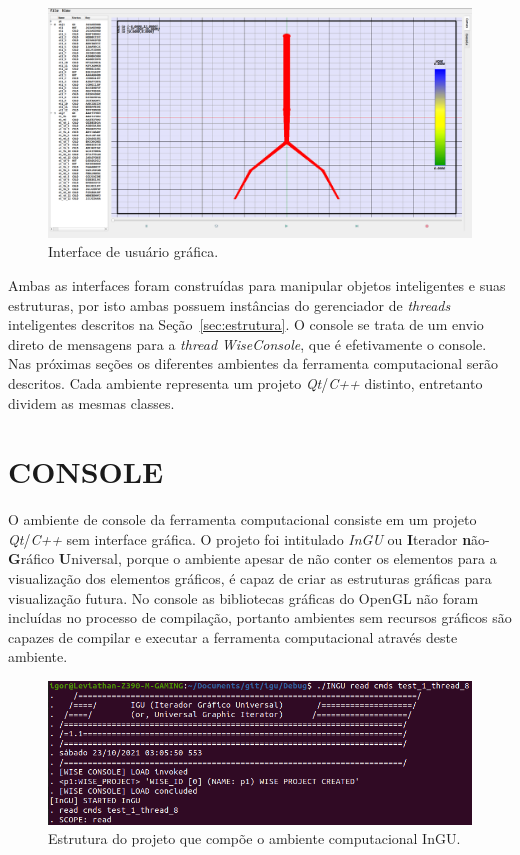 \begin{figure}[!htbp]
	\centering
	\includegraphics[width=\linewidth]{Figures/IGU_002.png}
	\caption{Interface de usuário gráfica.}
	\label{fig10:UI}
\end{figure}

Ambas as interfaces foram construídas para manipular objetos inteligentes e suas estruturas, por isto ambas possuem instâncias do gerenciador de \textit{threads} inteligentes descritos na Seção~\ref{sec:estrutura}. O console se trata de um envio direto de mensagens para a \textit{thread} \textit{WiseConsole}, que é efetivamente o console. Nas próximas seções os diferentes ambientes da ferramenta computacional serão descritos. Cada ambiente representa um projeto \textit{Qt}/\textit{C++} distinto, entretanto dividem as mesmas classes.

\section{CONSOLE}\label{sec:console}

O ambiente de console da ferramenta computacional consiste em um projeto \textit{Qt}/\textit{C++} sem interface gráfica. O projeto foi intitulado \textit{InGU} ou \textbf{I}terador \textbf{n}ão-\textbf{G}ráfico \textbf{U}niversal, porque o ambiente apesar de não conter os elementos para a visualização dos elementos gráficos, é capaz de criar as estruturas gráficas para visualização futura.  No console as bibliotecas gráficas do OpenGL não foram incluídas no processo de compilação, portanto ambientes sem recursos gráficos são capazes de compilar e executar a ferramenta computacional através deste ambiente.

\begin{figure}[!htbp]
	\centering
	\includegraphics[width=\linewidth]{Figures/InGU.png}
	\caption{Estrutura do projeto que compõe o ambiente computacional InGU.}
	\label{fig10:console}
\end{figure}

